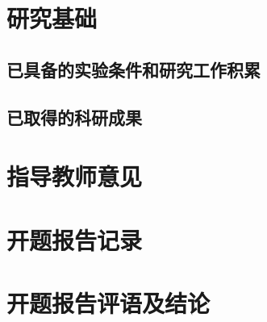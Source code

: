 \documentclass[mp]{xdupgtp}
\begin{document}
\section{研究基础}
\begin{yjjc}
\subsection{已具备的实验条件和研究工作积累}
\subsection{已取得的科研成果}
\end{yjjc}

\section{指导教师意见}
\begin{xnjsyj}
\end{xnjsyj}
\begin{xyjsyj}
\end{xyjsyj}

\section{开题报告记录}
\begin{bgjl}
\end{bgjl}

\section{开题报告评语及结论}
\begin{pyjl}
\end{pyjl}
\end{document}
